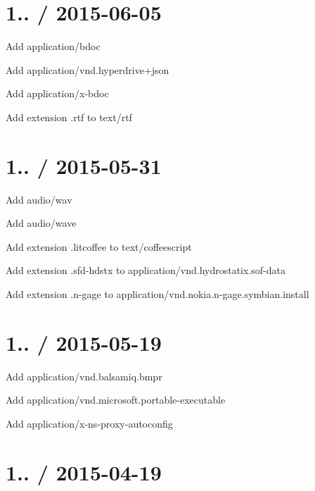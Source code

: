 \section*{1.. / 2015-\/06-\/05 }


\begin{DoxyItemize}
\item Add {\ttfamily application/bdoc}
\item Add {\ttfamily application/vnd.\+hyperdrive+json}
\item Add {\ttfamily application/x-\/bdoc}
\item Add extension {\ttfamily .rtf} to {\ttfamily text/rtf}
\end{DoxyItemize}

\section*{1.. / 2015-\/05-\/31 }


\begin{DoxyItemize}
\item Add {\ttfamily audio/wav}
\item Add {\ttfamily audio/wave}
\item Add extension {\ttfamily .litcoffee} to {\ttfamily text/coffeescript}
\item Add extension {\ttfamily .sfd-\/hdstx} to {\ttfamily application/vnd.\+hydrostatix.\+sof-\/data}
\item Add extension {\ttfamily .n-\/gage} to {\ttfamily application/vnd.\+nokia.\+n-\/gage.\+symbian.\+install}
\end{DoxyItemize}

\section*{1.. / 2015-\/05-\/19 }


\begin{DoxyItemize}
\item Add {\ttfamily application/vnd.\+balsamiq.\+bmpr}
\item Add {\ttfamily application/vnd.\+microsoft.\+portable-\/executable}
\item Add {\ttfamily application/x-\/ns-\/proxy-\/autoconfig}
\end{DoxyItemize}

\section*{1.. / 2015-\/04-\/19 }


